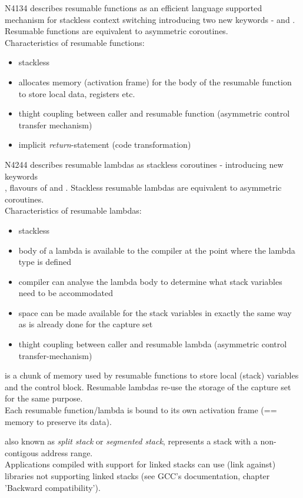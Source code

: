 N4134\cite{N4134} describes resumable functions as an efficient language
supported mechanism for stackless context switching introducing two new keywords
- \await and \yield. Resumable functions are equivalent to asymmetric
coroutines.\\
Characteristics of resumable functions:
\begin{itemize}
    \item stackless
    \item allocates memory (activation frame) for the body of the resumable
          function to store local data, registers etc.
    \item thight coupling between caller and resumable function (asymmetric
          control transfer mechanism)
    \item implicit \textit{return}-statement\cite{N4134} (code transformation)
\end{itemize}

N4244\cite{N4244} describes resumable lambdas as stackless coroutines -
introducing new keywords\\
\resumable, flavours of \yield and \rlthis. Stackless resumable lambdas are
equivalent to asymmetric coroutines.\\
Characteristics of resumable lambdas:
\begin{itemize}
    \item stackless
    \item body of a lambda is available to the compiler at the point
          where the lambda type is defined
    \item compiler can analyse the lambda body to determine what stack
          variables need to be accommodated
    \item space can be made available for the stack variables in exactly the
          same way as is already done for the capture set
    \item thight coupling between caller and resumable lambda (asymmetric
          control transfer-mechanism)
\end{itemize}

is a chunk of memory used by resumable functions to store local (stack)
variables and the control block. Resumable lambdas re-use the storage of the
capture set for the same purpose.\\
Each resumable function/lambda is bound to its own activation frame (== memory
to preserve its data).

also known as \textit{split stack}\cite{gccsplit} or
\textit{segmented stack}\cite{llvmseg}, represents a stack with a non-contigous
address range.\\
Applications compiled with support for linked stacks can use (link against)
libraries not supporting linked stacks (see GCC's documentation\cite{gccsplit},
chapter 'Backward compatibility').
